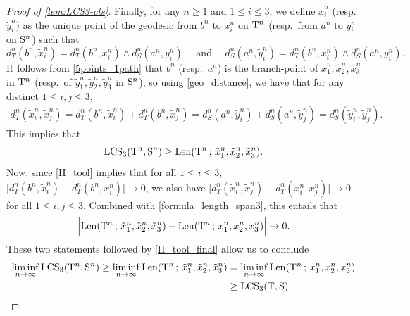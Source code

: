 \documentclass[11pt,reqno]{amsart}
\newcommand{\LCS}{\operatorname{LCS}}
\begin{document}
\begin{proof}[Proof of \cref{lem:LCS3-cts}]
Finally, for any $n\geq 1$ and $1\leq i\leq 3$, we define $\tilde{x}_i^n$ (resp.~$\tilde{y}_i^n)$ as the unique point of the geodesic from $b^n$ to $x_i^n$ on $\mathrm{T}^n$ (resp.~from $a^n$ to $y_i^n$ on $\mathrm{S}^n$) such that 
\[d_T^n(b^n,\tilde{x}_i^n)=d_T^n(b^n,x_i^n)\wedge d_S^n(a^n,y_i^n)\quad\text{ and }\quad d_S^n(a^n,\tilde{y}_i^n)=d_T^n(b^n,x_i^n)\wedge d_S^n(a^n,y_i^n).\]
It follows from \cref{5points_1path} that $b^n$ (resp.~$a^n$) is the branch-point of $\tilde{x}_1^n,\tilde{x}_2^n,\tilde{x}_3^n$ in $\mathrm{T}^n$ (resp.~of $\tilde{y}_1^n,\tilde{y}_2^n,\tilde{y}_3^n$ in $\mathrm{S}^n$), so using \eqref{geo_distance}, we have that for any distinct $1\leq i,j\leq 3$,
\begin{align*} d_T^n(\tilde{x}_i^n,\tilde{x}_j^n)=d_T^n(b^n,\tilde{x}_i^n)+d_T^n(b^n,\tilde{x}_j^n)=d_S^n(a^n,\tilde{y}_i^n)+d_S^n(a^n,\tilde{y}_j^n)=d_S^n(\tilde{y}_i^n,\tilde{y}_j^n).
\end{align*}
This implies that 
\[\LCS_3(\rT^n,\rS^n)\geq \mathrm{Len}(\rT^n\, ;\, \tilde{x}_1^n,\tilde{x}_2^n,\tilde{x}_3^n).\] 
Now, since \eqref{II_tool} implies that for all $1 \leq i \leq 3$, 
$\big|d_T^n(b^n,\tilde{x}_i^n)-d_T^n(b^n,x_i^n)\big|\to 0$,
we also have $\big|d_T^n(\tilde{x}_i^n,\tilde{x}_j^n)-d_T^n(x_i^n,x_j^n)\big|\to 0$ 
for all $1\leq i,j\leq 3$. Combined with \eqref{formula_length_span3}, this entails that
\[\Big|\mathrm{Len}(\mathrm{T}^n\, ;\, \tilde{x}_1^n,\tilde{x}_2^n,\tilde{x}_3^n)-\mathrm{Len}(\mathrm{T}^n\, ;\, x_1^n,x_2^n,x_3^n)\Big|\to 0.\]
These two statements followed by \eqref{II_tool_final} allow us to conclude
\begin{align*}
    \liminf_{n\to\infty}\LCS_3(\rT^n,\rS^n)\geq \liminf_{n\to\infty} \mathrm{Len}(\rT^n\, ;\, \tilde{x}_1^n,\tilde{x}_2^n,\tilde{x}_3^n) 
    &= \liminf_{n\to\infty} \mathrm{Len}(\rT^n\, ;\, x_1^n,x_2^n,x_3^n) \\
    &\geq \LCS_3(\rT,\rS). \qedhere
\end{align*}
\end{proof}
\end{document}
